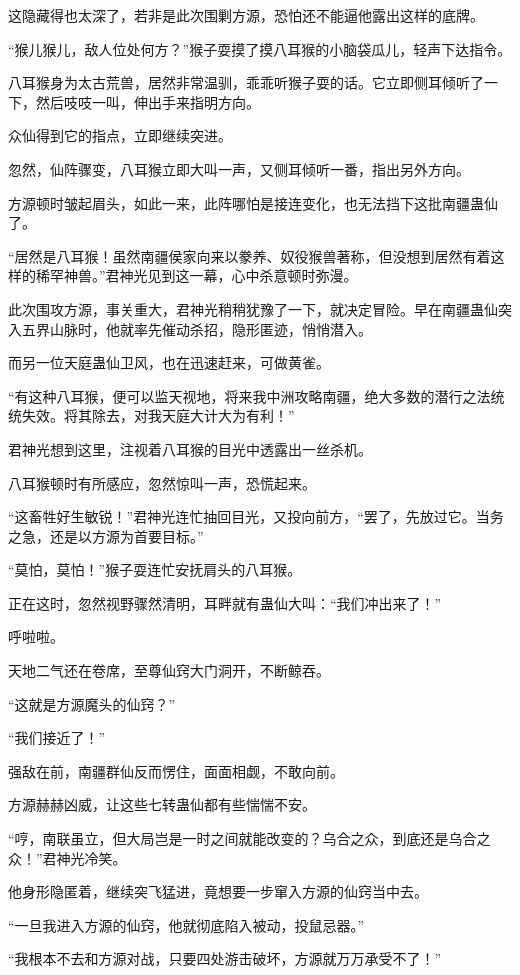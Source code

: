 \begin{this_body}
这隐藏得也太深了，若非是此次围剿方源，恐怕还不能逼他露出这样的底牌。

“猴儿猴儿，敌人位处何方？”猴子耍摸了摸八耳猴的小脑袋瓜儿，轻声下达指令。

八耳猴身为太古荒兽，居然非常温驯，乖乖听猴子耍的话。它立即侧耳倾听了一下，然后吱吱一叫，伸出手来指明方向。

众仙得到它的指点，立即继续突进。

忽然，仙阵骤变，八耳猴立即大叫一声，又侧耳倾听一番，指出另外方向。

方源顿时皱起眉头，如此一来，此阵哪怕是接连变化，也无法挡下这批南疆蛊仙了。

“居然是八耳猴！虽然南疆侯家向来以豢养、奴役猴兽著称，但没想到居然有着这样的稀罕神兽。”君神光见到这一幕，心中杀意顿时弥漫。

此次围攻方源，事关重大，君神光稍稍犹豫了一下，就决定冒险。早在南疆蛊仙突入五界山脉时，他就率先催动杀招，隐形匿迹，悄悄潜入。

而另一位天庭蛊仙卫风，也在迅速赶来，可做黄雀。

“有这种八耳猴，便可以监天视地，将来我中洲攻略南疆，绝大多数的潜行之法统统失效。将其除去，对我天庭大计大为有利！”

君神光想到这里，注视着八耳猴的目光中透露出一丝杀机。

八耳猴顿时有所感应，忽然惊叫一声，恐慌起来。

“这畜牲好生敏锐！”君神光连忙抽回目光，又投向前方，“罢了，先放过它。当务之急，还是以方源为首要目标。”

“莫怕，莫怕！”猴子耍连忙安抚肩头的八耳猴。

正在这时，忽然视野骤然清明，耳畔就有蛊仙大叫：“我们冲出来了！”

呼啦啦。

天地二气还在卷席，至尊仙窍大门洞开，不断鲸吞。

“这就是方源魔头的仙窍？”

“我们接近了！”

强敌在前，南疆群仙反而愣住，面面相觑，不敢向前。

方源赫赫凶威，让这些七转蛊仙都有些惴惴不安。

“哼，南联虽立，但大局岂是一时之间就能改变的？乌合之众，到底还是乌合之众！”君神光冷笑。

他身形隐匿着，继续突飞猛进，竟想要一步窜入方源的仙窍当中去。

“一旦我进入方源的仙窍，他就彻底陷入被动，投鼠忌器。”

“我根本不去和方源对战，只要四处游击破坏，方源就万万承受不了！”


\end{this_body}
